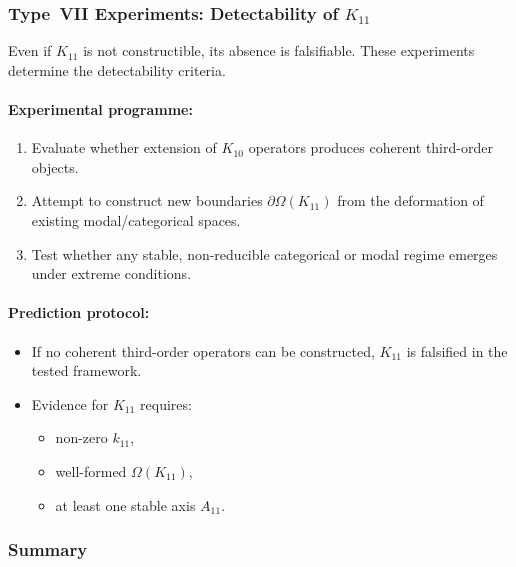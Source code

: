 \subsubsection{Type~VII Experiments: Detectability of $K_{11}$}

Even if $K_{11}$ is not constructible, its absence is falsifiable.  
These experiments determine the detectability criteria.

\paragraph{Experimental programme:}

\begin{enumerate}
    \item Evaluate whether extension of $K_{10}$ operators produces 
          coherent third-order objects.
    \item Attempt to construct new boundaries $\partial\Omega(K_{11})$ 
          from the deformation of existing modal/categorical spaces.
    \item Test whether any stable, non-reducible categorical or modal 
          regime emerges under extreme conditions.
\end{enumerate}

\paragraph{Prediction protocol:}

\begin{itemize}
    \item If no coherent third-order operators can be constructed, 
          $K_{11}$ is falsified in the tested framework.
    \item Evidence for $K_{11}$ requires:
          \begin{itemize}
              \item non-zero $k_{11}$,
              \item well-formed $\Omega(K_{11})$,
              \item at least one stable axis $A_{11}$.
          \end{itemize}
\end{itemize}



\subsubsection{Summary}


